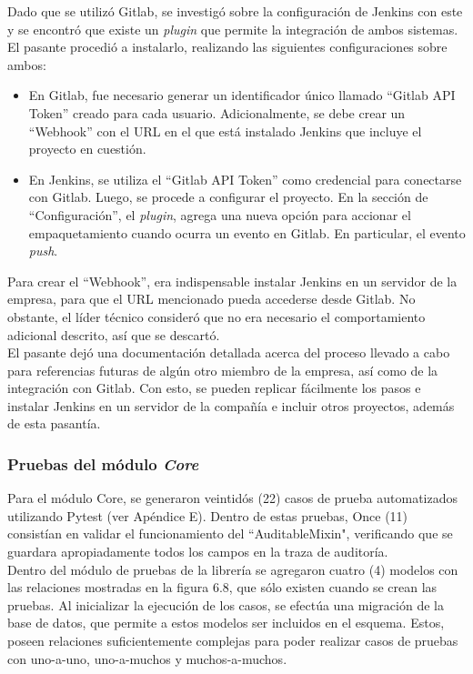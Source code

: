 Dado que se utilizó Gitlab, se investigó sobre la configuración de Jenkins con este y se encontró que existe un \textit{plugin} que permite la integración de ambos sistemas. El pasante procedió a instalarlo, realizando las siguientes configuraciones sobre ambos:

\begin{itemize}
    \item En Gitlab, fue necesario generar un identificador único llamado “Gitlab API Token” creado para cada usuario. Adicionalmente, se debe crear un “Webhook” con el URL en el que está instalado Jenkins que incluye el proyecto en cuestión.
    \item En Jenkins, se utiliza el “Gitlab API Token” como credencial para conectarse con Gitlab. Luego, se procede a configurar el proyecto. En la sección de “Configuración”, el \textit{plugin}, agrega una nueva opción para accionar el empaquetamiento cuando ocurra un evento en Gitlab. En particular, el evento \textit{push}.
\end{itemize}


Para crear el “Webhook”, era indispensable instalar Jenkins en un servidor de la empresa, para que el URL mencionado pueda accederse desde Gitlab. No obstante, el líder técnico consideró que no era necesario el comportamiento adicional descrito, así que se descartó.\\

El pasante dejó una documentación detallada acerca del proceso llevado a cabo para referencias futuras de algún otro miembro de la empresa, así como de la integración con Gitlab. Con esto, se pueden replicar fácilmente los pasos e instalar Jenkins en un servidor de la compañía e incluir otros proyectos, además de esta pasantía.

\subsubsection{Pruebas del módulo \textit{Core}}

Para el módulo Core, se generaron veintidós (22) casos de prueba automatizados utilizando Pytest (ver Apéndice E). Dentro de estas pruebas, Once (11) consistían en validar el funcionamiento del “AuditableMixin", verificando que se guardara apropiadamente todos los campos en la traza de auditoría. \\

Dentro del módulo de pruebas de la librería se agregaron cuatro (4) modelos con las relaciones mostradas en la figura 6.8, que sólo existen cuando se crean las pruebas. Al inicializar la ejecución de los casos, se efectúa una migración de la base de datos, que permite a estos modelos ser incluidos en el esquema. Estos, poseen relaciones suficientemente complejas para poder realizar casos de pruebas con uno-a-uno, uno-a-muchos y muchos-a-muchos.

